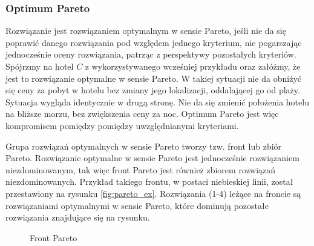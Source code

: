 \documentclass[twoside]{iisthesis}
\begin{document}
\subsubsection{Optimum Pareto}
Rozwiązanie jest rozwiązaniem optymalnym w sensie Pareto, jeśli nie da się poprawić danego rozwiązania pod względem jednego kryterium, nie pogarszając jednocześnie oceny rozwiązania, patrząc z perspektywy pozostałych kryteriów. Spójrzmy na hotel $C$ z wykorzystywanego wcześniej przykładu oraz załóżmy, że jest to rozwiązanie optymalne w sensie Pareto. W takiej sytuacji nie da obniżyć się ceny za pobyt w hotelu bez zmiany jego lokalizacji, oddalającej go od plaży. Sytuacja wygląda identycznie w drugą stronę. Nie da się zmienić położenia hotelu na bliższe morzu, bez zwiększenia ceny za noc. Optimum Pareto jest więc kompromisem pomiędzy pomiędzy uwzględnianymi kryteriami.

Grupa rozwiązań optymalnych w sensie Pareto tworzy tzw. front lub zbiór Pareto. Rozwiązanie optymalne w sensie Pareto jest jednocześnie rozwiązaniem niezdominowanym, tak więc front Pareto jest również zbiorem rozwiązań niezdominowanych. Przykład takiego frontu, w postaci niebieskiej linii, został przestawiony na rysunku \eqref{fig:pareto_ex}. Rozwiązania (1-4) leżące na froncie są rozwiązaniami optymalnymi w sensie Pareto, które dominują pozostałe rozwiązania znajdujące się na rysunku.
\begin{figure}[!htb]
	\centering
	\caption{Front Pareto}
	\label{fig:pareto_ex}
\end{figure}
\end{document}

